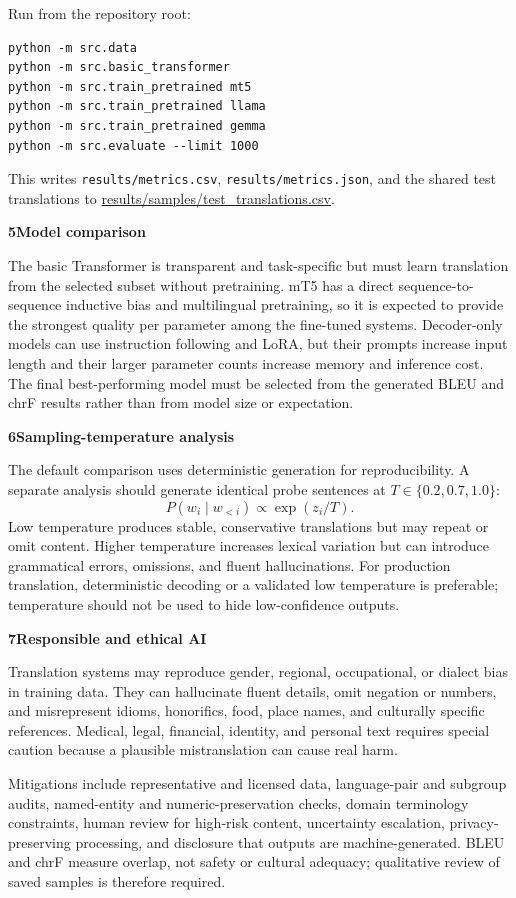 \documentclass[10pt]{article}
\newcommand{\sectiontitle}[1]{\par\vspace{5pt}\textbf{\large #1}\vspace{2pt}\par}
\begin{document}
Run from the repository root:
\begin{verbatim}
python -m src.data
python -m src.basic_transformer
python -m src.train_pretrained mt5
python -m src.train_pretrained llama
python -m src.train_pretrained gemma
python -m src.evaluate --limit 1000
\end{verbatim}
This writes \texttt{results/metrics.csv}, \texttt{results/metrics.json}, and the shared
test translations to \url{results/samples/test\_translations.csv}.

\sectiontitle{5\quad Model comparison}
The basic Transformer is transparent and task-specific but must learn translation from the
selected subset without pretraining. mT5 has a direct sequence-to-sequence inductive bias and
multilingual pretraining, so it is expected to provide the strongest quality per parameter
among the fine-tuned systems. Decoder-only models can use instruction following and LoRA,
but their prompts increase input length and their larger parameter counts increase memory and
inference cost. The final best-performing model must be selected from the generated BLEU and
chrF results rather than from model size or expectation.

\sectiontitle{6\quad Sampling-temperature analysis}
The default comparison uses deterministic generation for reproducibility. A separate analysis
should generate identical probe sentences at $T\in\{0.2,0.7,1.0\}$:
\[
P(w_i\mid w_{<i})\propto\exp(z_i/T).
\]
Low temperature produces stable, conservative translations but may repeat or omit content.
Higher temperature increases lexical variation but can introduce grammatical errors, omissions,
and fluent hallucinations. For production translation, deterministic decoding or a validated
low temperature is preferable; temperature should not be used to hide low-confidence outputs.

\sectiontitle{7\quad Responsible and ethical AI}
Translation systems may reproduce gender, regional, occupational, or dialect bias in training
data. They can hallucinate fluent details, omit negation or numbers, and misrepresent idioms,
honorifics, food, place names, and culturally specific references. Medical, legal, financial,
identity, and personal text requires special caution because a plausible mistranslation can cause
real harm.

Mitigations include representative and licensed data, language-pair and subgroup audits,
named-entity and numeric-preservation checks, domain terminology constraints, human review for
high-risk content, uncertainty escalation, privacy-preserving processing, and disclosure that
outputs are machine-generated. BLEU and chrF measure overlap, not safety or cultural adequacy;
qualitative review of saved samples is therefore required.
\end{document}
